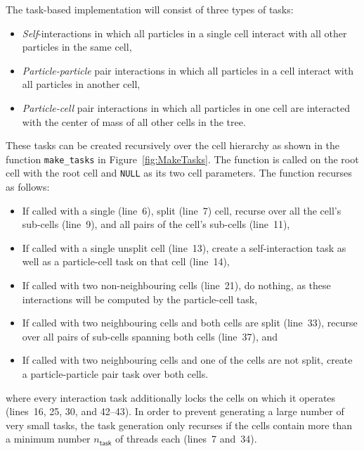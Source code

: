 \documentclass[preprint]{elsarticle}
\newcommand{\fig}[1]
    {Figure~\ref{fig:#1}}
\begin{document}
The task-based implementation will consist of three
types of tasks:
\begin{itemize}
    \item {\em Self}-interactions in which all particles
        in a single cell interact with all other particles in the
        same cell,
    \item {\em Particle-particle} pair interactions in which
        all particles in a cell interact with all
        particles in another cell,
    \item {\em Particle-cell} pair interactions in which
        all particles in one cell are interacted with the
        center of mass of all other cells in the tree.
\end{itemize}

These tasks can be created recursively over the cell hierarchy
as shown in the function {\tt make\_tasks} in \fig{MakeTasks}.
The function is called on the root cell with the root cell
and {\tt NULL} as its two cell parameters.
The function recurses as follows:
\begin{itemize}
    \item If called with a single (line~6), split (line~7) cell,
        recurse over all the cell's sub-cells (line~9), and all
        pairs of the cell's sub-cells (line~11),
    \item If called with a single unsplit cell (line~13),
        create a self-interaction task as well as a particle-cell
        task on that cell (line~14),
    \item If called with two non-neighbouring cells (line~21),
        do nothing, as these interactions
        will be computed by the particle-cell task,
    \item If called with two neighbouring cells and both cells
        are split (line~33),
        recurse over all pairs of sub-cells spanning
        both cells (line~37), and
    \item If called with two neighbouring cells
        and one of the cells are not split, create
        a particle-particle pair task over both cells.
\end{itemize}
\noindent where every interaction task additionally locks
the cells on which it operates (lines~16, 25, 30, and 42--43).
In order to prevent generating
a large number of very small tasks, the task generation only recurses
if the cells contain more than a minimum number $n_\mathsf{task}$
of threads each (lines~7 and~34).
\end{document}
